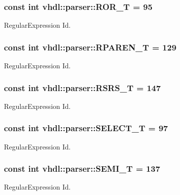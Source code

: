 \subsubsection[{R\+O\+R\+\_\+\+T}]{\setlength{\rightskip}{0pt plus 5cm}const int vhdl\+::parser\+::\+R\+O\+R\+\_\+\+T = 95}\label{namespacevhdl_1_1parser_a705cf7ce2e59683c656b8076a935d8e3}
Regular\+Expression Id. \hypertarget{namespacevhdl_1_1parser_a5665967f6b6a799bd937649f8f18ba91}{}
\subsubsection[{R\+P\+A\+R\+E\+N\+\_\+\+T}]{\setlength{\rightskip}{0pt plus 5cm}const int vhdl\+::parser\+::\+R\+P\+A\+R\+E\+N\+\_\+\+T = 129}\label{namespacevhdl_1_1parser_a5665967f6b6a799bd937649f8f18ba91}
Regular\+Expression Id. \hypertarget{namespacevhdl_1_1parser_ad052a24144e54747ee112ff2e10c8b2d}{}
\subsubsection[{R\+S\+R\+S\+\_\+\+T}]{\setlength{\rightskip}{0pt plus 5cm}const int vhdl\+::parser\+::\+R\+S\+R\+S\+\_\+\+T = 147}\label{namespacevhdl_1_1parser_ad052a24144e54747ee112ff2e10c8b2d}
Regular\+Expression Id. \hypertarget{namespacevhdl_1_1parser_a5b9adbd32dd14042c1d3e30390bf8a61}{}
\subsubsection[{S\+E\+L\+E\+C\+T\+\_\+\+T}]{\setlength{\rightskip}{0pt plus 5cm}const int vhdl\+::parser\+::\+S\+E\+L\+E\+C\+T\+\_\+\+T = 97}\label{namespacevhdl_1_1parser_a5b9adbd32dd14042c1d3e30390bf8a61}
Regular\+Expression Id. \hypertarget{namespacevhdl_1_1parser_a3e9f568ce1aca6da18546563a65bc37a}{}
\subsubsection[{S\+E\+M\+I\+\_\+\+T}]{\setlength{\rightskip}{0pt plus 5cm}const int vhdl\+::parser\+::\+S\+E\+M\+I\+\_\+\+T = 137}\label{namespacevhdl_1_1parser_a3e9f568ce1aca6da18546563a65bc37a}
Regular\+Expression Id. \hypertarget{namespacevhdl_1_1parser_a728e946f7da786ad91f5b9c1b5c9b2ec}{}
